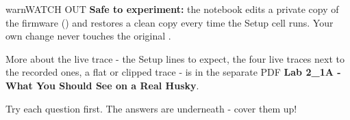 \documentclass[11pt,letterpaper]{article}
\begin{document}
\begin{guidecallout}{warn}{WATCH OUT}
\textbf{Safe to experiment:} the notebook edits a private copy of the firmware
() and restores a clean copy every time the Setup cell runs. Your
own change never touches the original .
\end{guidecallout}

More about the live trace - the Setup lines to expect, the four live traces next to the recorded ones, a flat or
clipped trace - is in the separate PDF \textbf{Lab 2\_1A - What You Should See on a Real Husky}.

\Needspace{173pt}


Try each question first. The answers are underneath - cover them up!
\end{document}
